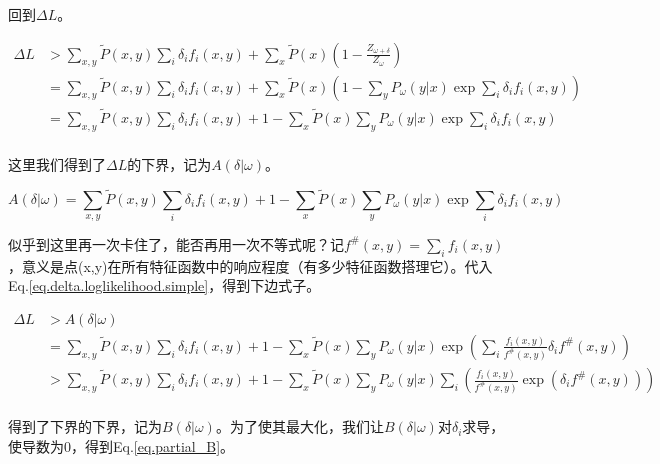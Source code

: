 \documentclass{article}
\begin{document}
      回到$\Delta{L}$。
      
	  \begin{equation}
		\begin{aligned}
			\Delta{L}&>\sum_{x,y}\tilde{P}(x,y)\sum_{i}\delta_{i}f_{i}(x,y)+\sum_{x}\tilde{P}(x)(1-\frac{Z_{\omega+\delta}}{Z_{\omega}})\\
			&=\sum_{x,y}\tilde{P}(x,y)\sum_{i}\delta_{i}f_{i}(x,y)+\sum_{x}\tilde{P}(x)(1-\sum_{y}P_{\omega}(y|x)\exp{\sum_{i}\delta_{i}f_{i}(x,y)})\\
			&=\sum_{x,y}\tilde{P}(x,y)\sum_{i}\delta_{i}f_{i}(x,y)+1-\sum_{x}\tilde{P}(x)\sum_{y}P_{\omega}(y|x)\exp{\sum_{i}\delta_{i}f_{i}(x,y)}\\ \label{eq.delta.loglikelihood.simple}
		\end{aligned}
	  \end{equation} 
  
      这里我们得到了$\Delta{L}$的下界，记为$A(\delta|\omega)$。
      
      \begin{equation}
      	A(\delta|\omega)=\sum_{x,y}\tilde{P}(x,y)\sum_{i}\delta_{i}f_{i}(x,y)+1-\sum_{x}\tilde{P}(x)\sum_{y}P_{\omega}(y|x)\exp{\sum_{i}\delta_{i}f_{i}(x,y)}
      \end{equation}
      
      似乎到这里再一次卡住了，能否再用一次不等式呢？记$f^{\#}(x,y)=\sum_{i}f_{i}(x,y)$，意义是点(x,y)在所有特征函数中的响应程度（有多少特征函数搭理它）。代入Eq.\ref{eq.delta.loglikelihood.simple}，得到下边式子。
      
	  \begin{equation}
		\begin{aligned}
			\Delta{L}&>A(\delta|\omega)\\ 
			&=\sum_{x,y}\tilde{P}(x,y)\sum_{i}\delta_{i}f_{i}(x,y)+1-\sum_{x}\tilde{P}(x)\sum_{y}P_{\omega}(y|x)\exp{(\sum_{i}\frac{f_{i}(x,y)}{f^{\#}(x,y)}\delta_{i}f^{\#}(x,y))}\\
			&>\sum_{x,y}\tilde{P}(x,y)\sum_{i}\delta_{i}f_{i}(x,y)+1-\sum_{x}\tilde{P}(x)\sum_{y}P_{\omega}(y|x)\sum_{i}(\frac{f_{i}(x,y)}{f^{\#}(x,y)}\exp{(\delta_{i}f^{\#}(x,y))})\\
			 \label{eq.delta.loglikelihood.simple2}
		\end{aligned}
	 \end{equation}       
     
     得到了下界的下界，记为$B(\delta|\omega)$。为了使其最大化，我们让$B(\delta|\omega)$对$\delta_{i}$求导，使导数为0，得到Eq.\ref{eq.partial_B}。
	 
\end{document}
